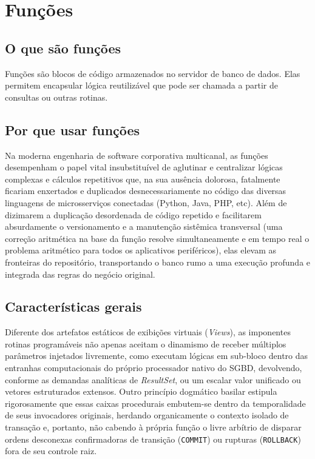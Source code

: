 \section{Funções}

\subsection{O que são funções}

Funções são blocos de código armazenados no servidor de banco de dados. Elas permitem encapsular lógica reutilizável que pode ser chamada a partir de consultas ou outras rotinas.

\subsection{Por que usar funções}

Na moderna engenharia de software corporativa multicanal, as funções desempenham o papel vital insubstituível de aglutinar e centralizar lógicas complexas e cálculos repetitivos que, na sua ausência dolorosa, fatalmente ficariam enxertados e duplicados desnecessariamente no código das diversas linguagens de microsserviços conectadas (Python, Java, PHP, etc). Além de dizimarem a duplicação desordenada de código repetido e facilitarem absurdamente o versionamento e a manutenção sistêmica transversal (uma correção aritmética na base da função resolve simultaneamente e em tempo real o problema aritmético para todos os aplicativos periféricos), elas elevam as fronteiras do repositório, transportando o banco rumo a uma execução profunda e integrada das regras do negócio original.

\subsection{Características gerais}

Diferente dos artefatos estáticos de exibições virtuais (\textit{Views}), as imponentes rotinas programáveis não apenas aceitam o dinamismo de receber múltiplos parâmetros injetados livremente, como executam lógicas em sub-bloco dentro das entranhas computacionais do próprio processador nativo do SGBD, devolvendo, conforme as demandas analíticas de \textit{ResultSet}, ou um escalar valor unificado ou vetores estruturados extensos. Outro princípio dogmático basilar estipula rigorosamente que essas caixas procedurais embutem-se dentro da temporalidade de seus invocadores originais, herdando organicamente o contexto isolado de transação e, portanto, não cabendo à própria função o livre arbítrio de disparar ordens desconexas confirmadoras de transição (\texttt{COMMIT}) ou rupturas (\texttt{ROLLBACK}) fora de seu controle raiz.


